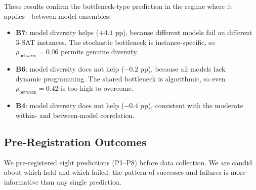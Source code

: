 \documentclass{article}
\theoremstyle{definition}
\theoremstyle{remark}
\begin{document}
These results confirm the bottleneck-type prediction in the regime where it applies---between-model ensembles:
\begin{itemize}[leftmargin=*,itemsep=1pt]
    \item \textbf{B7}: model diversity helps ($+4.1$ pp), because different models fail on different 3-SAT instances. The stochastic bottleneck is instance-specific, so $\rho_{\text{between}} = 0.06$ permits genuine diversity.
    \item \textbf{B6}: model diversity does not help ($-0.2$ pp), because all models lack dynamic programming. The shared bottleneck is algorithmic, so even $\rho_{\text{between}} = 0.42$ is too high to overcome.
    \item \textbf{B4}: model diversity does not help ($-0.4$ pp), consistent with the moderate within- and between-model correlation.
\end{itemize}

\subsection{Pre-Registration Outcomes}
\label{sec:exp_prereg}

We pre-registered eight predictions (P1--P8) before data collection.
We are candid about which held and which failed: the pattern of successes and failures is more informative than any single prediction.
\end{document}
